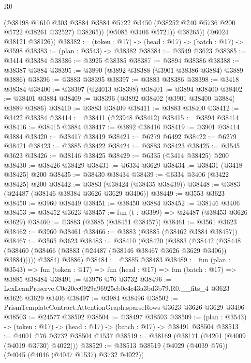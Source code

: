 \begin{lexlean}{R0}
\begin{coremodule}
              (@38198
                @1610
                @303
                @3884
                @3884
                @5722
                @3450
                (@38252 @240 @5736 @200 @5722 @38261 @32527)
                @38265))
            (@5085 @3406 @5721))
          @38265))
      (@6024 @38121 @38126))
@38382 := (token : @17) -> (head : @17) -> (batch : @17) -> @3598
@38383 := (plan : @3543) -> @38382
@38384 := @3549 @3623
@38385 := @3414 @38384
@38386 := @3925 @38385
@38387 := @3894 @38386
@38388 := @38387 @3884
@38395 := @3890 (@3892 @38388 (@3901 @38386 @3884) @3889 @3886)
@38396 := @3883 @38395
@38397 := @3883 @38386
@38398 := @3418 @38384
@38400 := @38397 (@24013 @38398)
@38401 := @3894 @38400
@38402 := @38401 @3884
@38409 := @38396 (@3892 @38402 (@3901 @38400 @3884) @3889 @3886)
@38410 := @3883 @38409
@38411 := @3883 @38400
@38412 := @3422 @38384
@38414 := @38411 (@23948 @38412)
@38415 := @3894 @38414
@38416 := @38415 @3884
@38417 := @3892 @38416
@38419 := @3901 @38414 @3884
@38420 := @38417 @38419
@38421 := @6279 @6492
@38422 := @6279 @38421
@38423 := @3885 @38422
@38424 := @3883 @38423
@38425 := @3545 @3623
@38426 := @38146 @38425
@38429 := @6335 (@3414 @38425) @200
@38430 := @38426 @38429
@38431 := @6334 @3629
@38434 := @38431 (@3418 @38425) @200
@38435 := @38430 @38434
@38439 := @6334 @3406 (@3422 @38425) @200
@38442 := @3883 (@38424 (@38435 @38439))
@38448 := @3883 (@24487 (@38146 @38384 @3626 @3629 @3406))
@38449 := @3553 @3623
@38450 := @3960 @38449
@38451 := @38450 @3884
@38452 := @38146 @3406
@38453 := @38452 @3623
@38457 := fun (t : @3399) => @24487 (@38453 @3626 @3629)
@38460 := @3883 (@3885 (@38451 @38457))
@38461 := @3561 @3623
@38462 := @3960 @38461
@38466 := @3883 (@3885 (@38462 @3884 @38457))
@38467 := @3565 @3623
@38483 := @38410
    (@38420
      (@3883
        (@38442 (@38448 (@38460 (@38466 (@3883 (@24487 (@38146 @38467 @3626 @3629 @3406)) @3884)))))
        @3884)
      @3886)
@38484 := @3885 @38483
@38489 := fun (plan : @3543) =>
  fun (token : @17) => fun (head : @17) => fun (batch : @17) => @3885 @38484
@38491 := @3976 @76 @3732
@38496 := LexLeanPreserve.C0e20cc0929a96925eb0c4c43a3bd3b79.R0.__fits_4 @3623 @3626 @3629 @3406
@38497 := @3984 @38496
@38502 := PrismTemplateContract.AttentionGraph.sparseRows @3623 @3626 @3629 @3406
@38503 := @24577 @38502
@38504 := @38497 @38503
@38509 := (plan : @3543) -> (token : @17) -> (head : @17) -> (batch : @17) -> @38491 @38504
@38513 := @4001 @76 @3732 @38504 @1537
@38519 := @38169 (@38171 (@4201 (@4009 (@4019 @3730) @4022)))
@38529 := @38513 @38519 (@4029 (@4039 @76)) (@4045 (@4046 (@4047 @1537) @3732 @4022))

\end{coremodule}
\end{lexlean}
